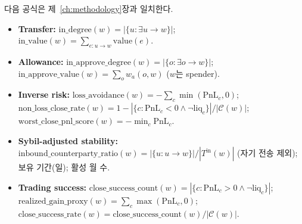 


\begin{table}[htbp]
\centering
\caption{주 평가에 사용된 기본 매개변수.}
\label{tab:parameter-summary}
\end{table}


다음 공식은 제~\ref{ch:methodology}장과 일치한다.

\begin{itemize}
\item \textbf{Transfer:} $\mathrm{in\_degree}(w)=|\{u:\exists u\to w\}|$; $\mathrm{in\_value}(w)=\sum_{e:u\to w}\mathrm{value}(e)$.

\item \textbf{Allowance:} $\mathrm{in\_approve\_degree}(w)=|\{o:\exists o\to w\}|$; $\mathrm{in\_approve\_value}(w)=\sum_o w_a(o,w)$ ($w$는 spender).

\item \textbf{Inverse risk:} $\mathrm{loss\_avoidance}(w)=-\sum_c\min(\mathrm{PnL}_c,0)$; $\mathrm{non\_loss\_close\_rate}(w)=1-|\{c:\mathrm{PnL}_c<0\land\neg\mathrm{liq}_c\}|/|\mathcal{C}(w)|$; $\mathrm{worst\_close\_pnl\_score}(w)=-\min_c\mathrm{PnL}_c$.

\item \textbf{Sybil-adjusted stability:} $\mathrm{inbound\_counterparty\_ratio}(w)=|\{u:u\to w\}|/|T^{\mathrm{in}}(w)|$ (자기 전송 제외); 보유 기간(일); 활성 월 수.

\item \textbf{Trading success:} $\mathrm{close\_success\_count}(w)=|\{c:\mathrm{PnL}_c>0\land\neg\mathrm{liq}_c\}|$; $\mathrm{realized\_gain\_proxy}(w)=\sum_c\max(\mathrm{PnL}_c,0)$; $\mathrm{close\_success\_rate}(w)=\mathrm{close\_success\_count}(w)/|\mathcal{C}(w)|$.
\end{itemize}

